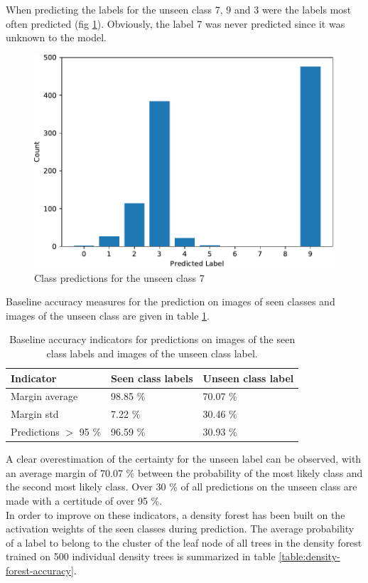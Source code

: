 \documentclass{article}
\begin{document}
When predicting the labels for the unseen class 7, 9 and 3 were the labels most often predicted (fig \ref{fig:pred-count}). Obviously, the label 7 was never predicted since it was unknown to the model.


\begin{figure}[H]
    \centering
    \includegraphics[width=.7\textwidth]{pred-count.pdf}
    \caption{Class predictions for the unseen class 7}
    \label{fig:pred-count}
\end{figure}

Baseline accuracy measures for the prediction on images of seen classes and images of the unseen class are given in table \ref{table:baseline-accuracy}.

\begin{table}[H]
    \centering
    \begin{tabular}{lll}\toprule
    Indicator & Seen class labels & Unseen class label \\\hline
    Margin average & 98.85 \% & 70.07 \% \\
    Margin std & 7.22  \% & 30.46 \% \\
    Predictions $>$ 95 \% & 96.59 \% & 30.93 \%
    \\ \bottomrule
    \end{tabular}
    \caption{Baseline accuracy indicators for predictions on images of the seen class labels and images of the unseen class label.}
    \label{table:baseline-accuracy}
\end{table}

A clear overestimation of the certainty for the unseen label can be observed, with an average margin of 70.07 \% between the probability of the most likely class and the second most likely class. Over 30 \% of all predictions on the unseen class are made with a certitude of over 95 \%.\\

In order to improve on these indicators, a density forest has been built on the activation weights of the seen classes during prediction. The average probability of a label to belong to the cluster of the leaf node of all trees in the density forest trained on 500 individual density trees is summarized in table \ref{table:density-forest-accuracy}. 
\end{document}
